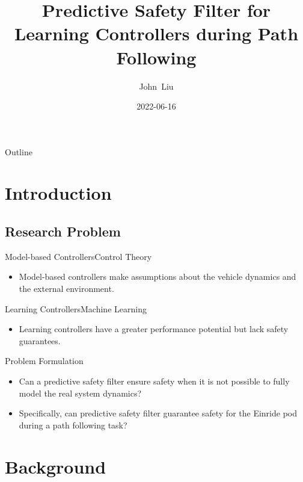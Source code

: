\documentclass{beamer}
\title[title]
{Predictive Safety Filter for Learning Controllers during Path Following}
\author[Author] %
{John~Liu\inst{1}} %
\institute[einride] %
{
  \inst{1}%
  Einride Master's Thesis Program
}
\date[final presenation] %
{2022-06-16}
\begin{document}
\begin{frame}[plain, t]
  \titlepage
\end{frame}

\begin{frame}{Outline}
  \tableofcontents
\end{frame}

\section{Introduction}

\subsection{Research Problem}

\begin{frame}{Model-based Controllers}{Control Theory}
    \begin{itemize}
        \item Model-based controllers make assumptions about the vehicle
              dynamics and the external environment.
    \end{itemize}
\end{frame}

\begin{frame}{Learning Controllers}{Machine Learning}
    \begin{itemize}
        \item Learning controllers have a greater performance potential but
              lack safety guarantees.
    \end{itemize}
\end{frame}

\begin{frame}{Problem Formulation}
    \begin{itemize}
        \item Can a predictive safety filter ensure safety when it is not possible
              to fully model the real system dynamics? \pause
        \item Specifically, can predictive safety filter guarantee safety for the
              Einride pod during a path following task?
    \end{itemize}
\end{frame}

\section{Background}
\end{document}
